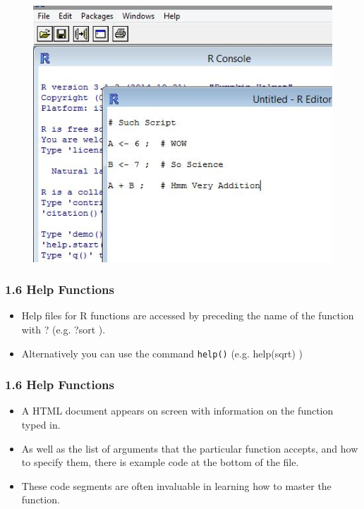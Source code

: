 \documentclass{beamer}
\begin{document}
 	\begin{frame}
 		\begin{figure}
 			\centering
 			\includegraphics[width=1.2\linewidth]{images/Rscript}         
 		\end{figure}
 	\end{frame}   
 	\begin{frame}
 		
 		\frametitle{1.6 Help Functions}
 		\begin{itemize}
 			\item  Help files for R functions are accessed by preceding the name of the function with ? (e.g. ?sort
 			). 
 			
 			\item Alternatively you can use the command \texttt{help()} (e.g. help(sqrt) )
 		\end{itemize}
 		
 	\end{frame}
 	\begin{frame}
 		
 		\frametitle{1.6 Help Functions}
 		\begin{itemize}
 			\item A HTML document appears on screen with information on the function typed in. 
 			\item As well
 			as the list of arguments that the particular function accepts, and how to specify them, there is
 			example code at the bottom of the file. 
 			\item These code segments are often invaluable in learning
 			how to master the function.
 		\end{itemize}
 		
 		
 	\end{frame}
 	
\end{document}
